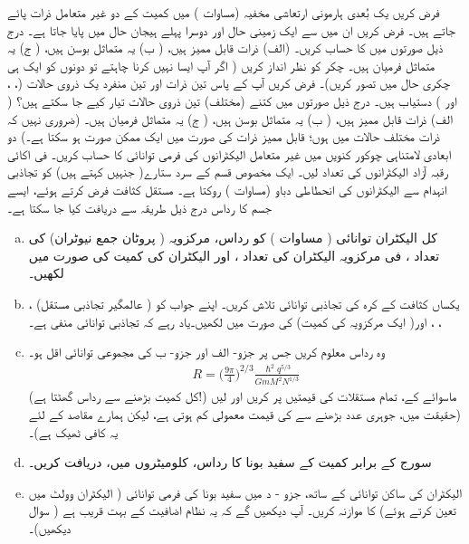 فرض کریں یک بُعدی ہارمونی ارتعاشی مخفیہ (مساوات ) میں کمیت  کے دو غیر متعامل ذرات پائے جاتے ہیں۔ فرض کریں ان میں سے ایک زمینی حال اور دوسرا پہلے ہیجان حال میں پایا جاتا ہے۔ درج ذیل صورتوں میں  کا حساب کریں۔ (الف) ذرات قابل ممیز ہیں، ( ب) یہ متماثل بوسن ہیں، ( ج) یہ متماثل فرمیان ہیں۔ چکر کو نظر انداز کریں ( اگر آپ ایسا نہیں کرنا چاہتے تو دونوں کو ایک ہی چکری حال میں تصور کریں)۔ 
فرض کریں آپ کے پاس تین ذرات اور تین منفرد یک ذروی حالات (، ، اور ) دستیاب ہیں۔ درج ذیل صورتوں میں کتنے (مختلف) تین ذروی حالات تیار کیے جا سکتے ہیں؟ ( الف) ذرات قابل ممیز ہیں، ( ب) یہ متماثل بوسن ہیں، ( ج) یہ متماثل فرمیان ہیں۔ (ضروری نہیں کہ ذرات مختلف حالات میں ہوں؛ قابل ممیز ذرات کی صورت میں  ایک ممکن صورت ہو سکتا ہے۔)
دو ابعادی لامتناہی چوکور کنویں میں غیر متعامل الیکٹرانوں کی فرمی توانائی کا حساب کریں۔ فی اکائی رقبہ آزاد الیکٹرانوں کی تعداد  لیں۔
ایک مخصوص قسم کے سرد ستارے( جنہیں  کہتے ہیں) کو تجاذبی انہدام سے الیکٹرانوں کی انحطاطی دباو (مساوات ) روکتا ہے۔ مستقل کثافت فرض کرتے ہوئے، ایسے جسم کا رداس  درج ذیل طریقہ سے دریافت کیا جا سکتا ہے۔
\begin{enumerate}[a.]
\item
کل الیکٹران توانائی ( مساوات ) کو رداس، مرکزویہ ( پروٹان جمع نیوٹران) کی تعداد ، فی مرکزویہ الیکٹران کی تعداد ، اور الیکٹران کی کمیت  کی صورت میں لکھیں۔ 
\item
 یکساں کثافت کے کرہ کی تجاذبی توانائی تلاش کریں۔ اپنے جواب کو ( عالمگیر تجاذبی مستقل) ، ، ، اور( ایک مرکزویہ کی کمیت)  کی صورت میں لکھیں۔یاد رہے کہ تجاذبی توانائی منفی ہے۔
\item
وہ رداس معلوم کریں جس پر جزو- الف اور جزو- ب کی مجموعی توانائی اقل ہو۔ 
\begin{align*}
R = \big ( \frac{9 \pi}{4} \big )^{2/3} \frac{\hslash^2 q^{5/3}}{GmM^2 N^{1/3}}
\end{align*}
(کل کمیت بڑھنے سے رداس گھٹتا ہے!) ماسوائے  کے، تمام مستقلات کی قیمتیں پر کریں اور  لیں (حقیقت میں، جوہری عدد بڑھنے سے  کی قیمت معمولی کم ہوتی ہے، لیکن ہمارے مقاصد کے لئے یہ کافی ٹھیک ہے)۔  
 \item 
 سورج کے برابر کمیت کے سفید بونا کا رداس، کلومیٹروں میں، دریافت کریں۔ 
\item
الیکٹران کی ساکن توانائی کے ساتھ، جزو - د میں سفید بونا کی فرمی توانائی ( الیکٹران وولٹ میں تعین کرتے ہوئے) کا موازنہ کریں۔ آپ دیکھیں گے کہ یہ نظام اضافیت کے بہت قریب ہے ( سوال  دیکھیں)۔
\end{enumerate}
